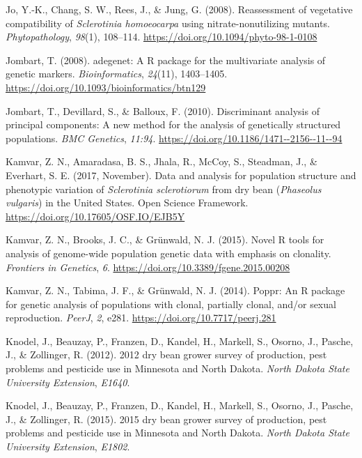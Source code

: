 \documentclass[fleqn,10pt,lineno]{wlpeerj} %
\theoremstyle{definition}
\theoremstyle{definition}
\theoremstyle{definition}
\theoremstyle{remark}
\begin{document}
\hypertarget{ref-jo2008reassessment}{}
Jo, Y.-K., Chang, S. W., Rees, J., \& Jung, G. (2008). Reassessment of
vegetative compatibility of \emph{Sclerotinia homoeocarpa} using
nitrate-nonutilizing mutants. \emph{Phytopathology}, \emph{98}(1),
108--114. \url{https://doi.org/10.1094/phyto-98-1-0108}

\hypertarget{ref-jombart2008adegenet}{}
Jombart, T. (2008). adegenet: A R package for the multivariate analysis
of genetic markers. \emph{Bioinformatics}, \emph{24}(11), 1403--1405.
\url{https://doi.org/10.1093/bioinformatics/btn129}

\hypertarget{ref-jombart2010discriminant}{}
Jombart, T., Devillard, S., \& Balloux, F. (2010). Discriminant analysis
of principal components: A new method for the analysis of genetically
structured populations. \emph{BMC Genetics}, \emph{11:94}.
\url{https://doi.org/10.1186/1471--2156--11--94}

\hypertarget{ref-kamvar2017data}{}
Kamvar, Z. N., Amaradasa, B. S., Jhala, R., McCoy, S., Steadman, J., \&
Everhart, S. E. (2017, November). Data and analysis for population
structure and phenotypic variation of \emph{Sclerotinia sclerotiorum}
from dry bean (\emph{Phaseolus vulgaris}) in the United States. Open
Science Framework. \url{https://doi.org/10.17605/OSF.IO/EJB5Y}

\hypertarget{ref-kamvar2015novel}{}
Kamvar, Z. N., Brooks, J. C., \& Grünwald, N. J. (2015). Novel R tools
for analysis of genome-wide population genetic data with emphasis on
clonality. \emph{Frontiers in Genetics}, \emph{6}.
\url{https://doi.org/10.3389/fgene.2015.00208}

\hypertarget{ref-kamvar2014poppr}{}
Kamvar, Z. N., Tabima, J. F., \& Grünwald, N. J. (2014). Poppr: An R
package for genetic analysis of populations with clonal, partially
clonal, and/or sexual reproduction. \emph{PeerJ}, \emph{2}, e281.
\url{https://doi.org/10.7717/peerj.281}

\hypertarget{ref-knodel2012dry}{}
Knodel, J., Beauzay, P., Franzen, D., Kandel, H., Markell, S., Osorno,
J., Pasche, J., \& Zollinger, R. (2012). 2012 dry bean grower survey of
production, pest problems and pesticide use in Minnesota and North
Dakota. \emph{North Dakota State University Extension}, \emph{E1640}.

\hypertarget{ref-knodel2015dry}{}
Knodel, J., Beauzay, P., Franzen, D., Kandel, H., Markell, S., Osorno,
J., Pasche, J., \& Zollinger, R. (2015). 2015 dry bean grower survey of
production, pest problems and pesticide use in Minnesota and North
Dakota. \emph{North Dakota State University Extension}, \emph{E1802}.
\end{document}
